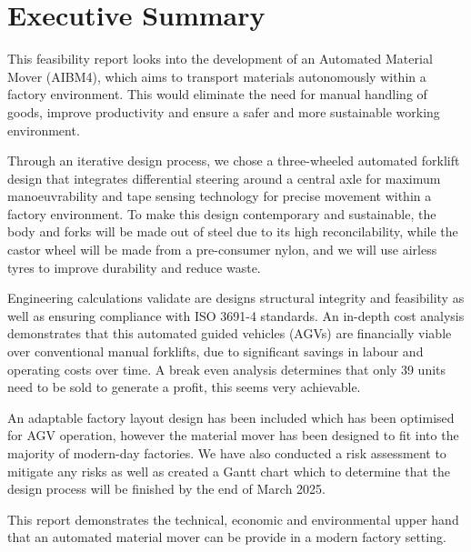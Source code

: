 \documentclass[12pt]{article}
\begin{document}
\tableofcontents

\newpage



\section{Executive Summary}
This feasibility report looks into the development of an Automated Material Mover (AIBM4), which aims to transport materials autonomously within a factory environment. This would eliminate the need for manual handling of goods, improve productivity and ensure a safer and more sustainable working environment. 
\par Through an iterative design process, we chose a three-wheeled automated forklift design that integrates differential steering around a central axle for maximum manoeuvrability and tape sensing technology for precise movement within a factory environment. To make this design contemporary and sustainable, the body and forks will be made out of steel due to its high reconcilability, while the castor wheel will be made from a pre-consumer nylon, and we will use airless tyres to improve durability and reduce waste.
\par Engineering calculations validate are designs structural integrity and feasibility as well as ensuring compliance with ISO 3691-4  standards. An in-depth cost analysis demonstrates that this automated guided vehicles (AGVs) are financially viable over conventional manual forklifts, due to significant savings in labour and operating costs over time. A break even analysis determines that only 39 units need to be sold to generate a profit, this seems very achievable.
\par An adaptable factory layout design has been included which has been optimised for AGV operation, however the material mover has been designed to fit into the majority of modern-day factories. We have also conducted a risk assessment to mitigate any risks as well as created a Gantt chart which to determine that the design process will be finished by the end of March 2025.
\par This report demonstrates the technical, economic and environmental upper hand that an automated material mover can be provide in a modern factory setting.
\end{document}
